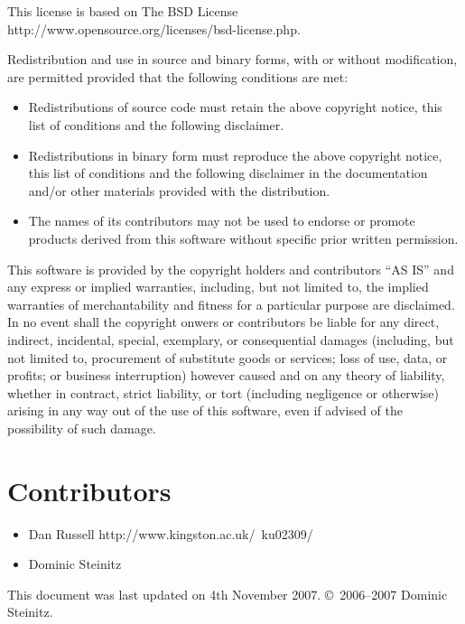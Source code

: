 \documentclass{article}
\begin{document}
This license is based on
\htmladdnormallinkfoot
{The BSD License}
{http://www.opensource.org/licenses/bsd-license.php}.

Redistribution and use in source and binary forms, with or without 
modification, are permitted provided that the following conditions are met:

\begin{itemize}
\item
Redistributions of source code must retain the above copyright notice, 
this list of conditions and the following disclaimer.
\item
Redistributions in binary form must reproduce the above copyright notice, 
this list of conditions and the following disclaimer in the documentation 
and/or other materials provided with the distribution.
\item
The names of its contributors may not be used to endorse or promote 
products derived from this software without specific prior written permission.
\end{itemize}

\begin{sc}
This software is provided by the copyright holders and contributors ``AS IS'' 
and any express or implied warranties, including, but not limited to, 
the implied warranties of merchantability and fitness for a particular 
purpose are disclaimed. In no event shall the copyright onwers or
contributors be liable for any direct, indirect, incidental, special,
exemplary, or consequential damages (including, but not limited to,
procurement of substitute goods or services; loss of use, data, or profits;
or business interruption) however caused and on any theory of liability,
whether in contract, strict liability, or tort (including negligence or
otherwise) arising in any way out of the use of this software,
even if advised of the possibility of such damage.
\end{sc}

\section{Contributors}

\begin{itemize}

\item
\htmladdnormallinkfoot
   {Dan Russell}
   {http://www.kingston.ac.uk/~ku02309/}

\item
Dominic Steinitz

\end{itemize}

This document was last updated on 4th November 2007.
\copyright\ 2006--2007 Dominic Steinitz. 
\end{document}
